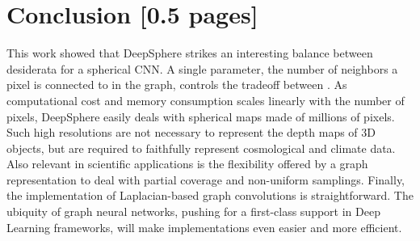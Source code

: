 \documentclass{article} %
\newcommand{\todo}[1]{{\color[rgb]{.6,.1,.6}{#1}}}
\begin{document}

\section{Conclusion [0.5 pages]}

This work showed that DeepSphere strikes an interesting balance between desiderata for a spherical CNN.
A single parameter, the number of neighbors a pixel is connected to in the graph, controls the tradeoff between \todo{performance and efficiency}.
As computational cost and memory consumption scales linearly with the number of pixels, DeepSphere easily deals with spherical maps made of millions of pixels.
Such high resolutions are not necessary to represent the depth maps of 3D objects, but are required to faithfully represent cosmological and climate data.
Also relevant in scientific applications is the flexibility offered by a graph representation to deal with partial coverage and non-uniform samplings.
Finally, the implementation of Laplacian-based graph convolutions is straightforward.
The ubiquity of graph neural networks, pushing for a first-class support in Deep Learning frameworks, will make implementations even easier and more efficient.
\end{document}
